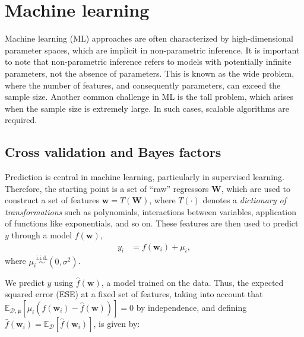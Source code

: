 \chapter{Machine learning}\label{chap13}

Machine learning (ML) approaches are often characterized by high-dimensional parameter spaces, which are implicit in non-parametric inference. It is important to note that non-parametric inference refers to models with potentially infinite parameters, not the absence of parameters. This is known as the wide problem, where the number of features, and consequently parameters, can exceed the sample size. Another common challenge in ML is the tall problem, which arises when the sample size is extremely large. In such cases, scalable algorithms are required.

\section{Cross validation and Bayes factors}\label{sec13_1}
Prediction is central in machine learning, particularly in supervised learning. Therefore, the starting point is a set of ``raw'' regressors \( \mathbf{W} \), which are used to construct a set of features \( \mathbf{w} = T(\mathbf{W}) \), where \( T(\cdot) \) denotes a \textit{dictionary of transformations} such as polynomials, interactions between variables, application of functions like exponentials, and so on. These features are then used to predict $y$ through a model $f(\mathbf{w})$,
\begin{align*}
	y_i &= f(\mathbf{w}_i) + \mu_i,
\end{align*}
where $\mu_i \stackrel{\text{i.i.d.}}{\sim} (0, \sigma^2)$.

We predict \( y \) using \( \hat{f}(\mathbf{w}) \), a model trained on the data. Thus, the expected squared error (ESE) at a fixed set of features, taking into account that \( \mathbb{E}_{\mathcal{D},\boldsymbol{\mu}} \left[\mu_i(f(\mathbf{w}_i) - \hat{f}(\mathbf{w}))\right] = 0 \) by independence, and defining \( \bar{f}(\mathbf{w}_i) = \mathbb{E}_{\mathcal{D}}[\hat{f}(\mathbf{w}_i)] \), is given by:

